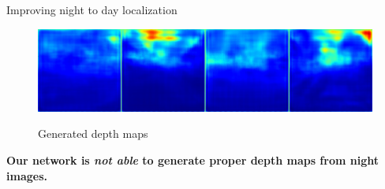 \begin{frame}{Improving night to day localization}
\begin{minipage}{0.80\linewidth}
	\vspace{-0.5cm}
	\begin{figure}
		\centering
		\begin{minipage}{0.74\linewidth}
			\includegraphics[width=\linewidth]{im/res/night_noft}
		\end{minipage}
		\begin{minipage}{0.25\linewidth}
			\raggedright \footnotesize
			{Generated depth maps}
		\end{minipage}
	\end{figure}
	\end{minipage}
	\vfill

	\textbf{Our network is \textit{not able} to generate proper depth maps from night images.}
\end{frame}

